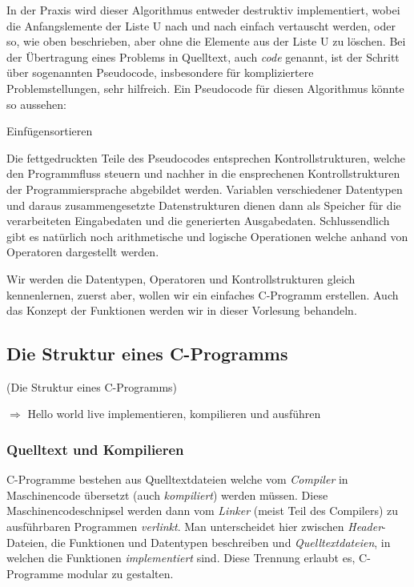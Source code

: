 In der Praxis wird dieser Algorithmus entweder destruktiv implementiert, wobei die Anfangslemente der Liste U nach und nach einfach vertauscht werden, oder so, wie oben beschrieben, aber ohne die Elemente aus der Liste U zu löschen.
Bei der Übertragung eines Problems in Quelltext, auch \emph{code} genannt, ist der Schritt über sogenannten Pseudocode, insbesondere für kompliziertere Problemstellungen, sehr hilfreich.
Ein Pseudocode für diesen Algorithmus könnte so aussehen:

\begin{algorithm}[H]
\caption{Einfügensortieren}
\label{alg:einfuegsort}

\end{algorithm}

\noindent Die fettgedruckten Teile des Pseudocodes entsprechen Kontrollstrukturen, welche den Programmfluss steuern und nachher in die ensprechenen Kontrollstrukturen der Programmiersprache abgebildet werden.
Variablen verschiedener Datentypen und daraus zusammengesetzte Datenstrukturen dienen dann als Speicher für die verarbeiteten Eingabedaten und die generierten Ausgabedaten.
Schlussendlich gibt es natürlich noch arithmetische und logische Operationen welche anhand von Operatoren dargestellt werden.

Wir werden die Datentypen, Operatoren und Kontrollstrukturen gleich kennenlernen, zuerst aber, wollen wir ein einfaches C-Programm erstellen.
Auch das Konzept der Funktionen werden wir in dieser Vorlesung behandeln.

\subsection{Die Struktur eines C-Programms}

\iflecturer
\begin{framed}

\slide{} (Die Struktur eines C-Programms)

$\Rightarrow$ Hello world live implementieren, kompilieren und ausführen
\end{framed}
\fi

\subsubsection{Quelltext und Kompilieren}

C-Programme bestehen aus Quelltextdateien welche vom \emph{Compiler} in Maschinencode übersetzt (auch \emph{kompiliert}) werden müssen.
Diese Maschinencodeschnipsel werden dann vom \emph{Linker} (meist Teil des Compilers) zu ausführbaren Programmen \emph{verlinkt}.
Man unterscheidet hier zwischen \emph{Header}-Dateien, die Funktionen und Datentypen beschreiben und \emph{Quelltextdateien}, in welchen die Funktionen \emph{implementiert} sind.
Diese Trennung erlaubt es, C-Programme modular zu gestalten.

